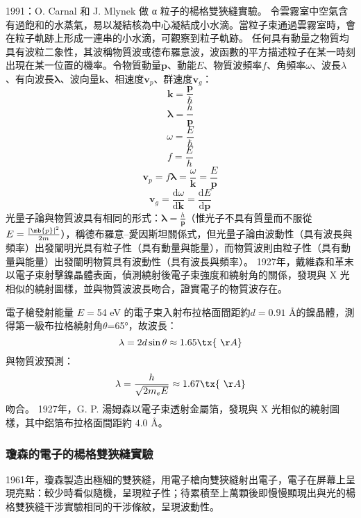 \documentclass[a4paper,12pt]{article}
\begin{document}
\item 1991：O. Carnal 和 J. Mlynek 做 α 粒子的楊格雙狹縫實驗。
\eit
{}
令雲霧室中空氣含有過飽和的水蒸氣，易以凝結核為中心凝結成小水滴。當粒子束通過雲霧室時，會在粒子軌跡上形成一連串的小水滴，可觀察到粒子軌跡。
任何具有動量之物質均具有波粒二象性，其波稱物質波或德布羅意波，波函數的平方描述粒子在某一時刻出現在某一位置的機率。令物質動量$\mathbf{p}$、動能$E$、物質波頻率$f$、角頻率$\omega$、波長$\lambda$、有向波長$\boldsymbol{\lambda}$、波向量$\mathbf{k}$、相速度$\mathbf{v}_p$、群速度$\mathbf{v}_g$：
\[\mathbf{k}=\frac{\mathbf{p}}{\hbar}\]
\[\boldsymbol{\lambda}=\frac{h}{\mathbf{p}}\]
\[\omega=\frac{E}{\hbar}\]
\[f=\frac{E}{h}\]
\[\mathbf{v}_p=f\boldsymbol{\lambda}=\frac{\omega}{\mathbf{k}}=\frac{E}{\mathbf{p}}\]
\[\mathbf{v}_g=\frac{\mathrm{d}\omega}{\mathrm{d}\mathbf{k}}=\frac{\mathrm{d}E}{\mathrm{d}\mathbf{p}}\]
光量子論與物質波具有相同的形式：$\boldsymbol{\lambda}=\frac{h}{\mathbf{p}}$（惟光子不具有質量而不服從$E=\frac{|\mb{p}|^2}{2m}$），稱德布羅意–愛因斯坦關係式，但光量子論由波動性（具有波長與頻率）出發闡明光具有粒子性（具有動量與能量），而物質波則由粒子性（具有動量與能量）出發闡明物質具有波動性（具有波長與頻率）。
1927年，戴維森和革末以電子束射擊鎳晶體表面，偵測繞射後電子束強度和繞射角的關係，發現與 X 光相似的繞射圖樣，並與物質波波長吻合，證實電子的物質波存在。

電子槍發射能量 $E=$54 eV 的電子束入射布拉格面間距約$d= 0.91$ \AA 的鎳晶體，測得第一級布拉格繞射角$\theta$=65°，故波長：
\[\lambda=2d\sin\theta\approx1.65\tx{\ \AA}\]
與物質波預測：
\[\lambda=\frac{h}{\sqrt{2m_eE}}\approx1.67\tx{\ \AA}\]
吻合。
1927年，G. P. 湯姆森以電子束透射金屬箔，發現與 X 光相似的繞射圖樣，其中鋁箔布拉格面間距約 $4.0$ \AA。
\subsubsection{瓊森的電子的楊格雙狹縫實驗}
1961年，瓊森製造出極細的雙狹縫，用電子槍向雙狹縫射出電子，電子在屏幕上呈現亮點：較少時看似隨機，呈現粒子性；待累積至上萬顆後即慢慢顯現出與光的楊格雙狹縫干涉實驗相同的干涉條紋，呈現波動性。
\end{document}
